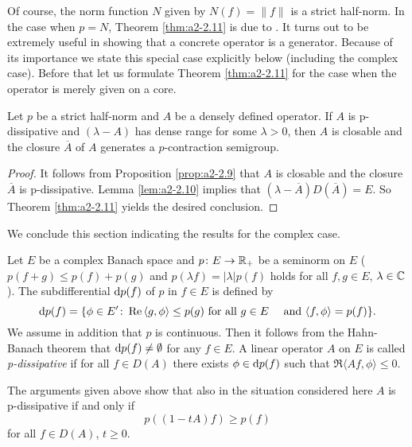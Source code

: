 Of course, the norm function $N$ given by $N(f) = \|f\|$ is a strict half-norm.
In the case when $p = N$, Theorem \ref{thm:a2-2.11}    
is due to \citet{lumerphillips:1961}.
It turns out to be extremely useful in showing that a concrete operator is a generator.
Because of its importance we state this special case explicitly below (including the complex case).
Before that let us formulate Theorem \ref{thm:a2-2.11}   
for the case when the operator is merely given on a core.

\begin{corollary}\label{cor:a2-2.12}
Let $p$ be a strict half-norm and $A$ be a densely defined operator.
If $A$ is p-dissipative and $(\lambda - A)$ has dense range for some $\lambda > 0$, then $A$ is closable and the closure $\overline{A}$ of $A$ generates a $p$-contraction semigroup.
\end{corollary}
\begin{proof}
It follows from Proposition \ref{prop:a2-2.9}  
that $A$ is closable and the closure $\overline{A}$ is p-dissipative.
Lemma \ref{lem:a2-2.10}   
implies that $(\lambda- \overline{A})D(\overline{A}) = E$.
So Theorem \ref{thm:a2-2.11}   
yields the desired conclusion.
\end{proof}
We conclude this section indicating the results for the complex case.

Let $E$ be a complex Banach space and $p \colon E \to \mathbb{R}_{+}$ 
be a seminorm on $E$ (\ie $p(f + g) \leq p(f) + p(g)$ and $p(\lambda f) = |\lambda|p(f)$ holds for all $f, g \in E$, $\lambda \in \mathbb{C}$).
The subdifferential $\mathop{}\!\mathrm{d}{p}(f)$ of $p$ in $f \in E$ is defined by
\begin{equation}\label{eq:a2-4.15}
\mathop{}\!\mathrm{d}{p}(f) = \{\phi \in E' \colon \mathop{}\!\mathrm{Re}\,\langle g,\phi \rangle \leq p(g) \text{ for all } g \in E \quad \text{ and } \langle f,\phi \rangle = p(f)  \}.
\end{equation}
We assume in addition that $p$ is continuous.
Then it follows from the Hahn-Banach theorem that $\mathop{}\!\mathrm{d}{p}(f) \neq \emptyset$ for any $f \in E$.
A linear operator $A$ on $E$ is called \emph{p-dissipative} if for all $f \in D(A)$ there exists $\phi \in \mathop{}\!\mathrm{d}{p}(f)$ such that $\Re\langle Af,\phi \rangle \leq 0$.

The arguments given above show that also in the situation considered here $A$ is p-dissipative if and only if
\[
    p((1-tA)f) \geq p(f)
\]
for all $f \in D(A)$, $t \geq 0$.


